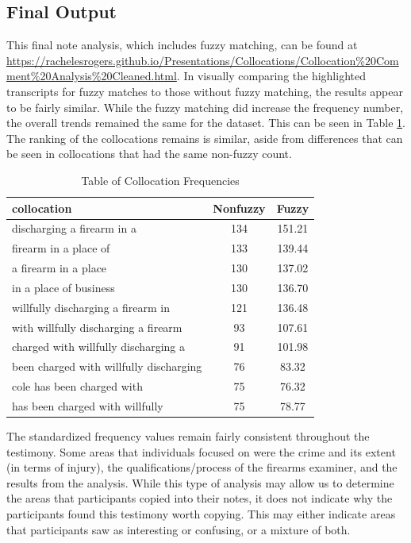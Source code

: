 \documentclass[print]{nuthesis}
\begin{document}
\hypertarget{final-output}{%
\subsection{Final Output}\label{final-output}}

This final note analysis, which includes fuzzy matching, can be found at \url{https://rachelesrogers.github.io/Presentations/Collocations/Collocation\%20Comment\%20Analysis\%20Cleaned.html}.
In visually comparing the highlighted transcripts for fuzzy matches to those without fuzzy matching, the results appear to be fairly similar.
While the fuzzy matching did increase the frequency number, the overall trends remained the same for the dataset.
This can be seen in Table \ref{tab:nonfuzzycount}.
The ranking of the collocations remains is similar, aside from differences that can be seen in collocations that had the same non-fuzzy count.

\begin{table}

\caption{\label{tab:nonfuzzycount}Table of Collocation Frequencies}
\centering
\begin{tabular}[t]{l|c|c}
\hline
collocation & Nonfuzzy & Fuzzy\\
\hline
discharging a firearm in a & 134 & 151.21\\
\hline
firearm in a place of & 133 & 139.44\\
\hline
a firearm in a place & 130 & 137.02\\
\hline
in a place of business & 130 & 136.70\\
\hline
willfully discharging a firearm in & 121 & 136.48\\
\hline
with willfully discharging a firearm & 93 & 107.61\\
\hline
charged with willfully discharging a & 91 & 101.98\\
\hline
been charged with willfully discharging & 76 & 83.32\\
\hline
cole has been charged with & 75 & 76.32\\
\hline
has been charged with willfully & 75 & 78.77\\
\hline
\end{tabular}
\end{table}

The standardized frequency values remain fairly consistent throughout the testimony.
Some areas that individuals focused on were the crime and its extent (in terms of injury), the qualifications/process of the firearms examiner, and the results from the analysis.
While this type of analysis may allow us to determine the areas that participants copied into their notes, it does not indicate why the participants found this testimony worth copying.
This may either indicate areas that participants saw as interesting or confusing, or a mixture of both.
\end{document}
